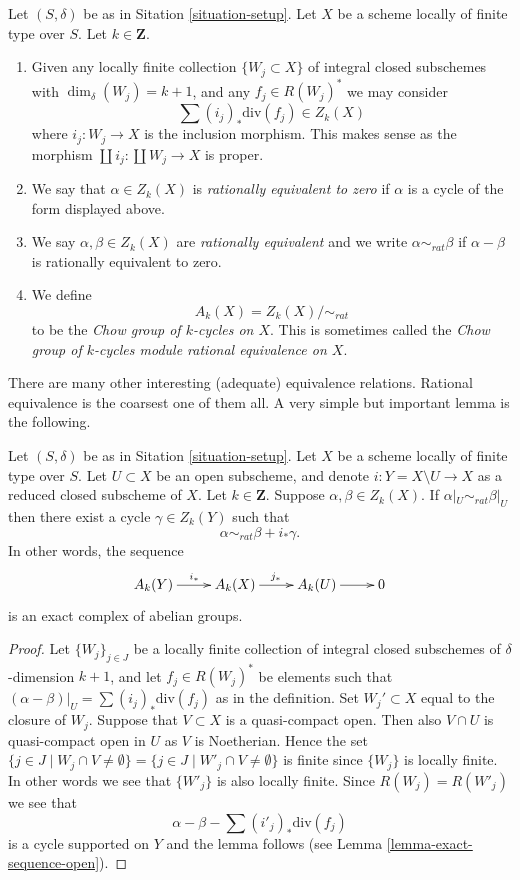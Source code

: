 \begin{definition}
\label{definition-rational-equivalence}
Let $(S, \delta)$ be as in Sitation \ref{situation-setup}.
Let $X$ be a scheme locally of finite type over $S$.
Let $k \in \mathbf{Z}$.
\begin{enumerate}
\item Given any locally finite collection $\{W_j \subset X\}$
of integral closed subschemes with $\dim_\delta(W_j) = k + 1$,
and any $f_j \in R(W_j)^*$ we may consider
$$
\sum (i_j)_*\text{div}(f_j) \in Z_k(X)
$$
where $i_j : W_j \to X$ is the inclusion morphism.
This makes sense as the morphism
$\coprod i_j : \coprod W_j \to X$ is proper.
\item We say that $\alpha \in Z_k(X)$ is {\it rationally equivalent to zero}
if $\alpha$ is a cycle of the form displayed above.
\item We say $\alpha, \beta \in Z_k(X)$ are
{\it rationally equivalent} and we write $\alpha \sim_{rat} \beta$
if $\alpha - \beta$ is rationally equivalent to zero.
\item We define
$$
A_k(X) = Z_k(X) / \sim_{rat}
$$
to be the {\it Chow group of $k$-cycles on $X$}. This is sometimes called
the {\it Chow group of $k$-cycles module rational equivalence on $X$}.
\end{enumerate}
\end{definition}

\noindent
There are many other interesting (adequate) equivalence relations.
Rational equivalence is the coarsest one of them all.
A very simple but important lemma is the following.

\begin{lemma}
\label{lemma-restrict-to-open}
Let $(S, \delta)$ be as in Sitation \ref{situation-setup}.
Let $X$ be a scheme locally of finite type over $S$.
Let $U \subset X$ be an open subscheme, and denote
$i : Y = X \setminus U \to X$ as a reduced closed subscheme of $X$.
Let $k \in \mathbf{Z}$.
Suppose $\alpha, \beta \in Z_k(X)$.
If $\alpha|_U \sim_{rat} \beta|_U$ then there exist a cycle
$\gamma \in Z_k(Y)$ such that
$$
\alpha \sim_{rat} \beta + i_*\gamma.
$$
In other words, the sequence
$$
\xymatrix{
A_k(Y) \ar[r]^{i_*} & A_k(X) \ar[r]^{j_*} & A_k(U) \ar[r] & 0
}
$$
is an exact complex of abelian groups.
\end{lemma}

\begin{proof}
Let $\{W_j\}_{j \in J}$ be a locally finite collection of integral closed
subschemes of $\delta$-dimension $k + 1$, and let $f_j \in R(W_j)^*$
be elements such that $(\alpha - \beta)|_U = \sum (i_j)_*\text{div}(f_j)$
as in the definition. Set $W_j' \subset X$ equal
to the closure of $W_j$. Suppose that $V \subset X$ is a quasi-compact
open. Then also $V \cap U$ is quasi-compact open in $U$ as
$V$ is Noetherian. Hence the set
$\{j \in J \mid W_j \cap V \not = \emptyset\}
= \{j \in J \mid W'_j \cap V \not = \emptyset\}$
is finite since $\{W_j\}$ is locally finite. In other words we see that
$\{W'_j\}$ is also locally finite. Since $R(W_j) = R(W'_j)$ we see
that
$$
\alpha - \beta - \sum (i'_j)_*\text{div}(f_j)
$$
is a cycle supported on $Y$ and the lemma follows (see
Lemma \ref{lemma-exact-sequence-open}).
\end{proof}

